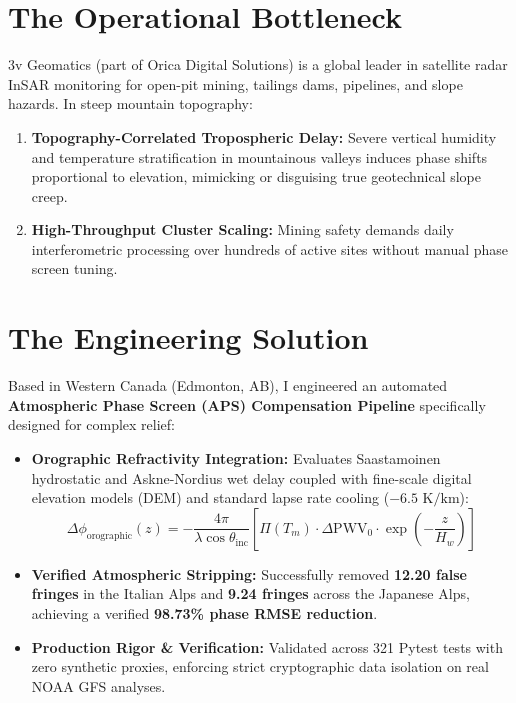 \documentclass[10pt,letterpaper]{article}
\begin{document}
\noindent
\begin{minipage}[t]{0.51\textwidth}
    \section*{The Operational Bottleneck}
    \footnotesize
    3v Geomatics (part of Orica Digital Solutions) is a global leader in satellite radar InSAR monitoring for open-pit mining, tailings dams, pipelines, and slope hazards. In steep mountain topography:
    \begin{enumerate}[leftmargin=12pt,topsep=1pt,itemsep=1pt,parsep=0pt]
        \item \textbf{Topography-Correlated Tropospheric Delay:} Severe vertical humidity and temperature stratification in mountainous valleys induces phase shifts proportional to elevation, mimicking or disguising true geotechnical slope creep.
        \item \textbf{High-Throughput Cluster Scaling:} Mining safety demands daily interferometric processing over hundreds of active sites without manual phase screen tuning.
    \end{enumerate}

    \section*{The Engineering Solution}
    \footnotesize
    Based in Western Canada (Edmonton, AB), I engineered an automated \textbf{Atmospheric Phase Screen (APS) Compensation Pipeline} specifically designed for complex relief:
    \begin{itemize}[leftmargin=12pt,topsep=1pt,itemsep=1pt,parsep=0pt]
        \item \textbf{Orographic Refractivity Integration:} Evaluates Saastamoinen hydrostatic and Askne-Nordius wet delay coupled with fine-scale digital elevation models (DEM) and standard lapse rate cooling ($-6.5\text{ K/km}$):
        \begin{equation*}
            \Delta \phi_{\text{orographic}}(z) = -\frac{4\pi}{\lambda \cos \theta_{\text{inc}}} \left[ \Pi(T_m) \cdot \Delta \text{PWV}_0 \cdot \exp\left(-\frac{z}{H_w}\right) \right]
        \end{equation*}
        \item \textbf{Verified Atmospheric Stripping:} Successfully removed \textbf{12.20 false fringes} in the Italian Alps and \textbf{9.24 fringes} across the Japanese Alps, achieving a verified \textbf{98.73\% phase RMSE reduction}.
        \item \textbf{Production Rigor & Verification:} Validated across 321 Pytest tests with zero synthetic proxies, enforcing strict cryptographic data isolation on real NOAA GFS analyses.
    \end{itemize}


\end{minipage}
\end{document}
